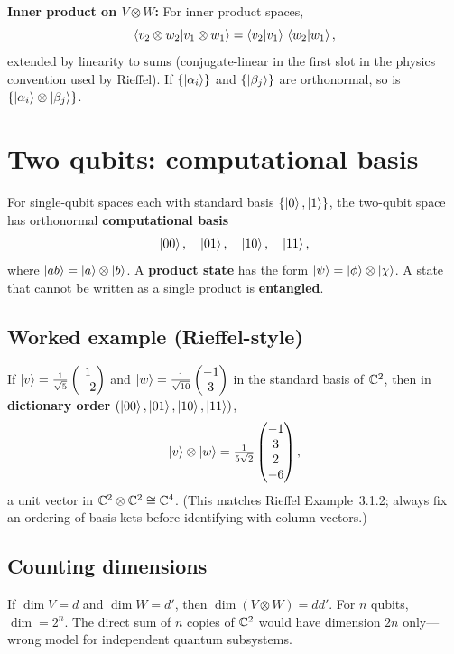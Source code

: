 \textbf{Inner product on $V\otimes W$:} For inner product spaces,
\[
\left\langle v_2\otimes w_2\middle|v_1\otimes w_1\right\rangle=\left\langle v_2\middle|v_1\right\rangle\,\left\langle w_2\middle|w_1\right\rangle,
\]
extended by linearity to sums (conjugate-linear in the first slot in the physics convention used by Rieffel). If $\{\left|\alpha_i\right\rangle\}$ and $\{\left|\beta_j\right\rangle\}$ are orthonormal, so is $\{\left|\alpha_i\right\rangle\otimes\left|\beta_j\right\rangle\}$.

\section{Two qubits: computational basis}

For single-qubit spaces each with standard basis $\{\left|0\right\rangle,\left|1\right\rangle\}$, the two-qubit space has orthonormal \textbf{computational basis}
\[
\left|00\right\rangle,\quad \left|01\right\rangle,\quad \left|10\right\rangle,\quad \left|11\right\rangle,
\]
where $\left|ab\right\rangle=\left|a\right\rangle\otimes\left|b\right\rangle$. A \textbf{product state} has the form $\left|\psi\right\rangle=\left|\phi\right\rangle\otimes\left|\chi\right\rangle$. A state that cannot be written as a single product is \textbf{entangled}.

\subsection*{Worked example (Rieffel-style)}
If $\left|v\right\rangle=\tfrac{1}{\sqrt{5}}\begin{pmatrix}1\\-2\end{pmatrix}$ and $\left|w\right\rangle=\tfrac{1}{\sqrt{10}}\begin{pmatrix}-1\\3\end{pmatrix}$ in the standard basis of $\mathbb{C}^2$, then in \textbf{dictionary order} $(\left|00\right\rangle,\left|01\right\rangle,\left|10\right\rangle,\left|11\right\rangle)$,
\[
\left|v\right\rangle\otimes\left|w\right\rangle
=\tfrac{1}{5\sqrt{2}}\begin{pmatrix}-1\\3\\2\\-6\end{pmatrix},
\]
a unit vector in $\mathbb{C}^2\otimes\mathbb{C}^2\cong\mathbb{C}^4$. (This matches Rieffel Example~3.1.2; always fix an ordering of basis kets before identifying with column vectors.)

\subsection*{Counting dimensions}
If $\dim V=d$ and $\dim W=d'$, then $\dim(V\otimes W)=dd'$. For $n$ qubits, $\dim = 2^n$. The direct sum of $n$ copies of $\mathbb{C}^2$ would have dimension $2n$ only---wrong model for independent quantum subsystems.


